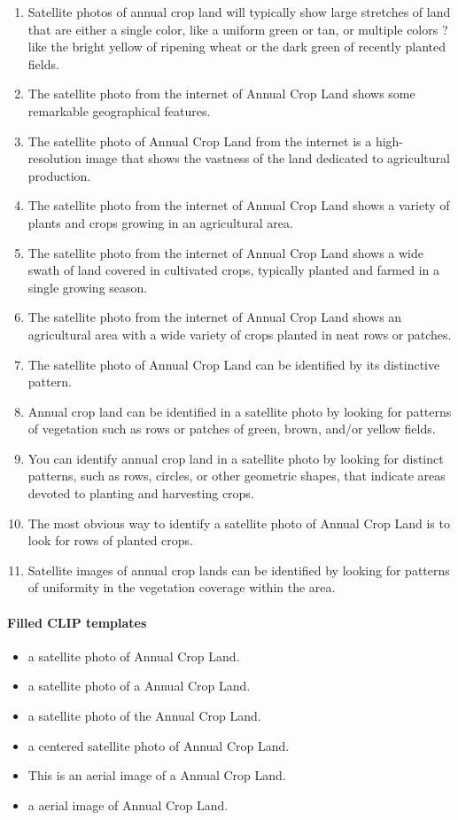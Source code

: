 \documentclass[11pt]{article}
\begin{document}
\begin{enumerate}
\item Satellite photos of annual crop land will typically show large stretches of land that are either a single color, like a uniform green or tan, or multiple colors ? like the bright yellow of ripening wheat or the dark green of recently planted fields.
\item The satellite photo from the internet of Annual Crop Land shows some remarkable geographical features.
\item The satellite photo of Annual Crop Land from the internet is a high-resolution image that shows the vastness of the land dedicated to agricultural production.
\item The satellite photo from the internet of Annual Crop Land shows a variety of plants and crops growing in an agricultural area.
\item The satellite photo from the internet of Annual Crop Land shows a wide swath of land covered in cultivated crops, typically planted and farmed in a single growing season.
\item The satellite photo from the internet of Annual Crop Land shows an agricultural area with a wide variety of crops planted in neat rows or patches.
\item The satellite photo of Annual Crop Land can be identified by its distinctive pattern.
\item Annual crop land can be identified in a satellite photo by looking for patterns of vegetation such as rows or patches of green, brown, and/or yellow fields.
\item You can identify annual crop land in a satellite photo by looking for distinct patterns, such as rows, circles, or other geometric shapes, that indicate areas devoted to planting and harvesting crops.
\item The most obvious way to identify a satellite photo of Annual Crop Land is to look for rows of planted crops.
\item Satellite images of annual crop lands can be identified by looking for patterns of uniformity in the vegetation coverage within the area.
\end{enumerate}
\paragraph{Filled CLIP templates}\begin{itemize}
\item a satellite photo of Annual Crop Land.
\item a satellite photo of a Annual Crop Land.
\item a satellite photo of the Annual Crop Land.
\item a centered satellite photo of Annual Crop Land.
\item This is an aerial image of a Annual Crop Land.
\item a aerial image of Annual Crop Land.
\end{itemize}
\end{document}
